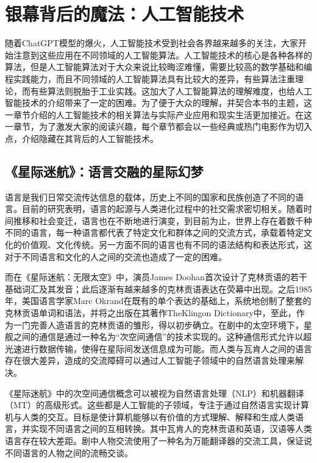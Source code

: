\setchapterpreamble[u]{\margintoc}
\chapter{银幕背后的魔法：人工智能技术}

随着ChatGPT模型的爆火，人工智能技术受到社会各界越来越多的关注，大家开始注意到这些应用在不同领域的人工智能算法。人工智能技术的核心是各种各样的算法，但是人工智能算法对于大众来说比较晦涩难懂，需要比较高的数学基础和编程实践能力，而且不同领域的人工智能算法具有比较大的差异，有些算法注重理论，而有些算法则脱胎于工业实践。这加大了人工智能算法的理解难度，也给人工智能技术的介绍带来了一定的困难。为了便于大众的理解，并契合本书的主题，这一章节介绍的人工智能技术的相关算法与实际产业应用和现实生活更加接近。在这一章节，为了激发大家的阅读兴趣，每个章节都会以一些经典或热门电影作为切入点，介绍隐藏在其背后的人工智能技术。

\section{《星际迷航》：语言交融的星际幻梦}

语言是我们日常交流传达信息的载体，历史上不同的国家和民族创造了不同的语言。目前的研究表明，语言的起源与人类进化过程中的社交需求密切相关。随着时间推移和社会变迁，语言也在不断地进行演变，到目前为止，世界上存在着数千种不同的语言，每一种语言都代表了特定文化和群体之间的交流方式，承载着特定文化的价值观、文化传统。另一方面不同的语言也有不同的语法结构和表达形式，这对于不同语言和文化的人之间的交流也造成了一定的困难。

而在《星际迷航：无限太空》中，演员James Doohan首次设计了克林贡语的若干基础词汇及其发音；此后逐渐有越来越多的克林贡语表达在荧幕中出现。之后1985年，美国语言学家Marc Okrand在既有的单个表达的基础上，系统地创制了整套的克林贡语单词和语法，并将之出版在其著作TheKlingon Dictionary中，至此，作为一门完善人造语言的克林贡语的雏形，得以初步确立。在剧中的太空环境下，星舰之间的通信是通过一种名为“次空间通信”的技术实现的。这种通信形式允许以超光速进行数据传输，使得在星际间发送信息成为可能。而人类与瓦肯人之间的语言存在很大差异，造成的交流障碍可以通过人工智能子领域中的自然语言处理来解决。

《星际迷航》中的次空间通信概念可以被视为自然语言处理（NLP）和机器翻译（MT）的高级形式。这些都是人工智能的子领域，专注于通过自然语言实现计算机与人类的交互。目标是使计算机能够以有价值的方式理解、解释和生成人类语言，并实现不同语言之间的互相转换。其中瓦肯人的克林贡语和英语，汉语等人类语言存在较大差距。剧中人物交流使用了一种名为万能翻译器的交流工具，保证说不同语言的人物之间的流畅交谈。

